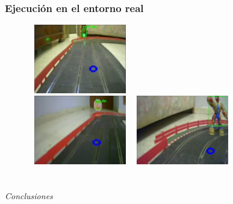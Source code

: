 \documentclass{beamer}
\makeatletter
\newenvironment{conditions*}
{\par\vspace{\abovedisplayskip}\noindent
\tabularx{\columnwidth}{>{$}l<{$} @{\ : } >{\raggedright\arraybackslash}X}}
{\endtabularx\par\vspace{\belowdisplayskip}}
\makeatother
\begin{document}
\begin{frame}
	\frametitle{Ejecución en el entorno real}
	\begin{figure}
		\centering
		\includegraphics[width=4.5cm, height=3cm]{figs/screenshottrafficlight}\\\vspace{0.5cm}
		\includegraphics[width=4.5cm,
			height=3cm]{figs/screenshotstopsign}\hspace{1cm}\includegraphics[width=4.5cm, height=3cm]{figs/screenshotpedestrian}
	\end{figure}
\end{frame}



\section*{}
\begin{frame}{}
	\centering \Huge
	\emph{Conclusiones}
\end{frame}
\end{document}
